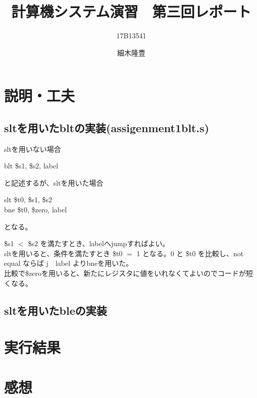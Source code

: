 \documentclass{jarticle}
\title{計算機システム演習　第三回レポート}
\author{17B13541 \and 細木隆豊}
\date{}
\begin{document}
\maketitle

  \section{説明・工夫}
    \subsection{sltを用いたbltの実装(assigenment1blt.s)}

    sltを用いない場合
    \begin{center}
    blt   \$s1, \$s2, label
    \end{center}
    と記述するが、sltを用いた場合
    \begin{center}
    slt   \$t0, \$s1, \$s2\\
    bne   \$t0, \$zero, label
    \end{center}
    となる。

    \$s1 $<$ \$s2 を満たすとき、labelへjumpすればよい。\\
    sltを用いると、条件を満たすとき \$t0 $=$ 1 となる。0 と \$t0 を比較し、not equal ならば j~~label よりbneを用いた。\\
    比較で\$zeroを用いると、新たにレジスタに値をいれなくてよいのでコードが短くなる。
    \subsection{sltを用いたbleの実装}
  \section{実行結果}
  \section{感想}
\end{document}
